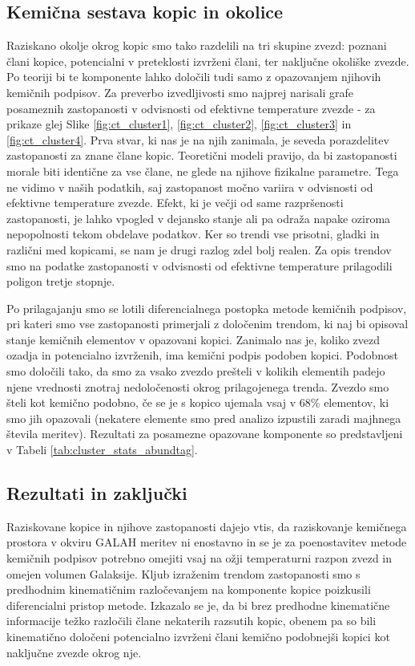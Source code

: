 \subsection{Kemična sestava kopic in okolice}
Raziskano okolje okrog kopic smo tako razdelili na tri skupine zvezd: poznani člani kopice, potencialni v preteklosti izvrženi člani, ter naključne okoliške zvezde. Po teoriji bi te komponente lahko določili tudi samo z opazovanjem njihovih kemičnih podpisov. Za preverbo izvedljivosti smo najprej narisali grafe posameznih zastopanosti v odvisnosti od efektivne temperature zvezde - za prikaze glej Slike \ref{fig:ct_cluster1}, \ref{fig:ct_cluster2}, \ref{fig:ct_cluster3} in \ref{fig:ct_cluster4}. Prva stvar, ki nas je na njih zanimala, je seveda porazdelitev zastopanosti za znane člane kopic. Teoretični modeli pravijo, da bi zastopanosti morale biti identične za vse člane, ne glede na njihove fizikalne parametre. Tega ne vidimo v naših podatkih, saj zastopanost močno variira v odvisnosti od efektivne temperature zvezde. Efekt, ki je večji od same razpršenosti zastopanosti, je lahko vpogled v dejansko stanje ali pa odraža napake oziroma nepopolnosti tekom obdelave podatkov. Ker so trendi vse prisotni, gladki in različni med kopicami, se nam je drugi razlog zdel bolj realen. Za opis trendov smo na podatke zastopanosti v odvisnosti od efektivne temperature prilagodili poligon tretje stopnje.

Po prilagajanju smo se lotili diferencialnega postopka metode kemičnih podpisov, pri kateri smo vse zastopanosti primerjali z določenim trendom, ki naj bi opisoval stanje kemičnih elementov v opazovani kopici. Zanimalo nas je, koliko zvezd ozadja in potencialno izvrženih, ima kemični podpis podoben kopici. Podobnost smo določili tako, da smo za vsako zvezdo prešteli v kolikih elementih padejo njene vrednosti znotraj nedoločenosti okrog prilagojenega trenda. Zvezdo smo šteli kot kemično podobno, če se je s kopico ujemala vsaj v $68$\% elementov, ki smo jih opazovali (nekatere elemente smo pred analizo izpustili zaradi majhnega števila meritev). Rezultati za posamezne opazovane komponente so predstavljeni v Tabeli \ref{tab:cluster_stats_abundtag}.

\subsection{Rezultati in zaključki}
Raziskovane kopice in njihove zastopanosti dajejo vtis, da raziskovanje kemičnega prostora v okviru GALAH meritev ni enostavno in se je za poenostavitev metode kemičnih podpisov potrebno omejiti vsaj na ožji temperaturni razpon zvezd in omejen volumen Galaksije. Kljub izraženim trendom zastopanosti smo s predhodnim kinematičnim razločevanjem na komponente kopice poizkusili diferencialni pristop metode. Izkazalo se je, da bi brez predhodne kinematične informacije težko razločili člane nekaterih razsutih kopic, obenem pa so bili kinematično določeni potencialno izvrženi člani kemično podobnejši kopici kot naključne zvezde okrog nje.

